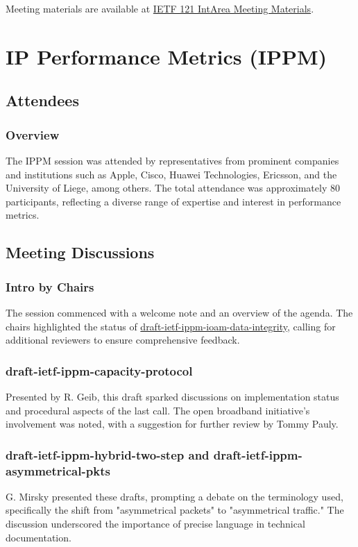 \documentclass{article}
\begin{document}
Meeting materials are available at \href{https://www.ietf.org/proceedings/121/intarea.html}{IETF 121 IntArea Meeting Materials}.



\newpage

\section{IP Performance Metrics (IPPM)}

\subsection{Attendees}
\subsubsection{Overview}
The IPPM session was attended by representatives from prominent companies and institutions such as Apple, Cisco, Huawei Technologies, Ericsson, and the University of Liege, among others. The total attendance was approximately 80 participants, reflecting a diverse range of expertise and interest in performance metrics.

\subsection{Meeting Discussions}

\subsubsection{Intro by Chairs}
The session commenced with a welcome note and an overview of the agenda. The chairs highlighted the status of \href{https://datatracker.ietf.org/doc/html/draft-ietf-ippm-ioam-data-integrity}{draft-ietf-ippm-ioam-data-integrity}, calling for additional reviewers to ensure comprehensive feedback.

\subsubsection{draft-ietf-ippm-capacity-protocol}
Presented by R. Geib, this draft sparked discussions on implementation status and procedural aspects of the last call. The open broadband initiative's involvement was noted, with a suggestion for further review by Tommy Pauly.

\subsubsection{draft-ietf-ippm-hybrid-two-step and draft-ietf-ippm-asymmetrical-pkts}
G. Mirsky presented these drafts, prompting a debate on the terminology used, specifically the shift from "asymmetrical packets" to "asymmetrical traffic." The discussion underscored the importance of precise language in technical documentation.
\end{document}
